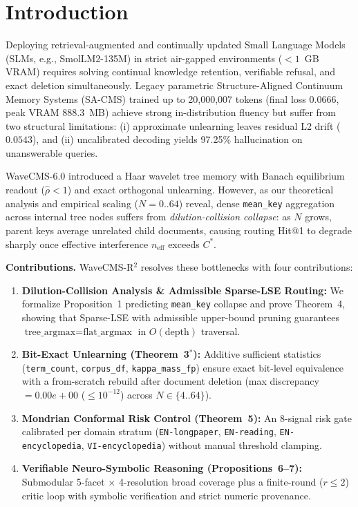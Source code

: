 \documentclass[conference]{IEEEtran}
\begin{document}
\section{Introduction}
Deploying retrieval-augmented and continually updated Small Language Models (SLMs, e.g., SmolLM2-135M) in strict air-gapped environments ($<1$~GB VRAM) requires solving continual knowledge retention, verifiable refusal, and exact deletion simultaneously. Legacy parametric Structure-Aligned Continuum Memory Systems (SA-CMS) trained up to 20,000,007 tokens (final loss 0.0666, peak VRAM 888.3~MB) achieve strong in-distribution fluency but suffer from two structural limitations: (i) approximate unlearning leaves residual L2 drift ($0.0543$), and (ii) uncalibrated decoding yields 97.25\% hallucination on unanswerable queries.

WaveCMS-6.0 introduced a Haar wavelet tree memory with Banach equilibrium readout ($\hat{\rho} < 1$) and exact orthogonal unlearning. However, as our theoretical analysis and empirical scaling ($N=0..64$) reveal, dense \texttt{mean\_key} aggregation across internal tree nodes suffers from \emph{dilution-collision collapse}: as $N$ grows, parent keys average unrelated child documents, causing routing Hit@1 to degrade sharply once effective interference $n_{\text{eff}}$ exceeds $C^*$.

\textbf{Contributions.} WaveCMS-R$^2$ resolves these bottlenecks with four contributions:
\begin{enumerate}
    \item \textbf{Dilution-Collision Analysis \& Admissible Sparse-LSE Routing:} We formalize Proposition~1 predicting \texttt{mean\_key} collapse and prove Theorem~4, showing that Sparse-LSE with admissible upper-bound pruning guarantees $\text{tree\_argmax} = \text{flat\_argmax}$ in $O(\text{depth})$ traversal.
    \item \textbf{Bit-Exact Unlearning (Theorem~3$^*$):} Additive sufficient statistics (\texttt{term\_count}, \texttt{corpus\_df}, \texttt{kappa\_mass\_fp}) ensure exact bit-level equivalence with a from-scratch rebuild after document deletion (max discrepancy $= 0.00e+00$ ($\le 10^{-12}$) across $N \in \{4..64\}$).
    \item \textbf{Mondrian Conformal Risk Control (Theorem~5):} An 8-signal risk gate calibrated per domain stratum (\texttt{EN-longpaper}, \texttt{EN-reading}, \texttt{EN-encyclopedia}, \texttt{VI-encyclopedia}) without manual threshold clamping.
    \item \textbf{Verifiable Neuro-Symbolic Reasoning (Propositions~6--7):} Submodular 5-facet $\times$ 4-resolution broad coverage plus a finite-round ($r \le 2$) critic loop with symbolic verification and strict numeric provenance.
\end{enumerate}
\end{document}

